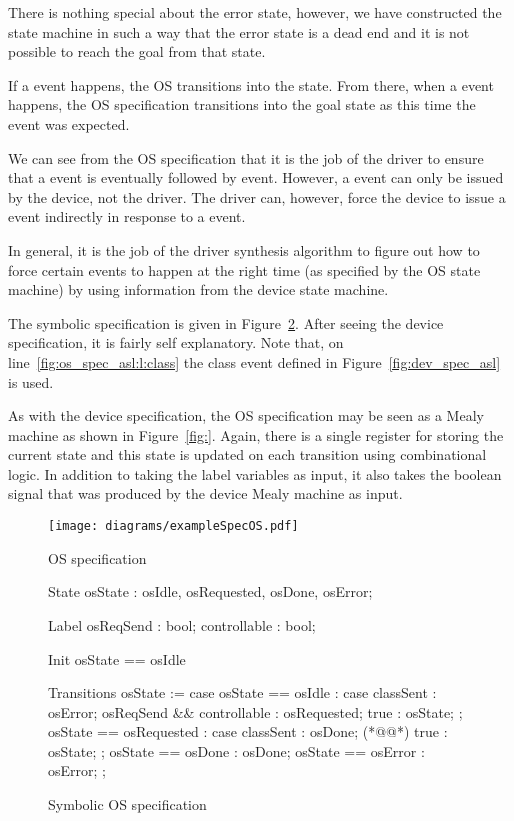 There is nothing special about the error state, however, we have constructed the state machine in such a way that the error state is a dead end and it is not possible to reach the goal from that state.

If a  event happens, the OS transitions into the  state. From there, when a  event happens, the OS specification transitions into the goal state as this time the  event was expected. 

We can see from the OS specification that it is the job of the driver to ensure that a  event is eventually followed by  event. However, a  event can only be issued by the device, not the driver. The driver can, however, force the device to issue a  event indirectly in response to a  event. 

In general, it is the job of the driver synthesis algorithm to figure out how to force certain events to happen at the right time (as specified by the OS state machine) by using information from the device state machine. 

The symbolic specification is given in Figure~\ref{fig:os_spec_asl}. After seeing the device specification, it is fairly self explanatory. Note that, on line~\ref{fig:os_spec_asl:l:class} the class event defined in Figure~\ref{fig:dev_spec_asl} is used.

As with the device specification, the OS specification may be seen as a Mealy machine as shown in Figure~\ref{fig:}. Again, there is a single register for storing the current state and this state is updated on each transition using combinational logic. In addition to taking the label variables as input, it also takes the  boolean signal that was produced by the device Mealy machine as input. 

\begin{figure}
\centering
\texttt{[image: diagrams/exampleSpecOS.pdf]}
\caption{OS specification}
\label{fig:os_spec}
\end{figure}

\begin{figure}
\centering
\begin{asllisting}

State
osState  : {osIdle, osRequested, osDone, osError};

Label
osReqSend    : bool;
controllable : bool;

Init
osState == osIdle 

Transitions
osState := case {
    osState == osIdle :
        case {
            classSent                 : osError;
            osReqSend && controllable : osRequested;
            true                      : osState;
        };
    osState == osRequested :
        case {
            classSent : osDone; (*@\label{fig:os_spec_asl:l:class}@*)
            true      : osState;
        };
    osState == osDone  : osDone;
    osState == osError : osError;
};

\end{asllisting}
\caption{Symbolic OS specification}
\label{fig:os_spec_asl}
\end{figure}

